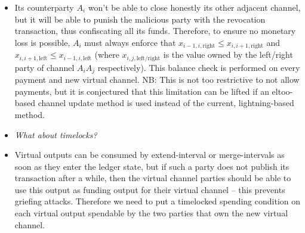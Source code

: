 \begin{itemize}
{  extend-interval or merge-intervals txs)?}
  \item Its counterparty $A_i$ won't be able to close honestly its other
  adjacent channel, but it will be able to punish the malicious party with the
  revocation transaction, thus confiscating all its funds. Therefore, to ensure
  no monetary loss is possible, $A_i$ must always enforce that $x_{i-1, i,
  \mathrm{right}} \leq x_{i, i+1, \mathrm{right}}$ and $x_{i, i+1,
  \mathrm{left}} \leq x_{i-1, i, \mathrm{left}}$ (where $x_{i, j,
  \mathrm{left/right}}$ is the value owned by the left/right party of channel
  $A_i A_j$ respectively). This balance check is performed on every payment and
  new virtual channel. NB: This is not too restrictive to not allow payments,
  but it is conjectured that this limitation can be lifted if an eltoo-based
  channel update method is used instead of the current, lightning-based method.
  \item \emph{What about timelocks?}
  \item Virtual outputs can be consumed by extend-interval or merge-intervals as
  soon as they enter the ledger state, but if such a party does not publish its
  transaction after a while, then the virtual channel parties should be able to
  use this output as funding output for their virtual channel -- this prevents
  griefing attacks. Therefore we need to put a timelocked spending condition on
  each virtual output spendable by the two parties that own the new virtual
  channel.


\end{itemize}

